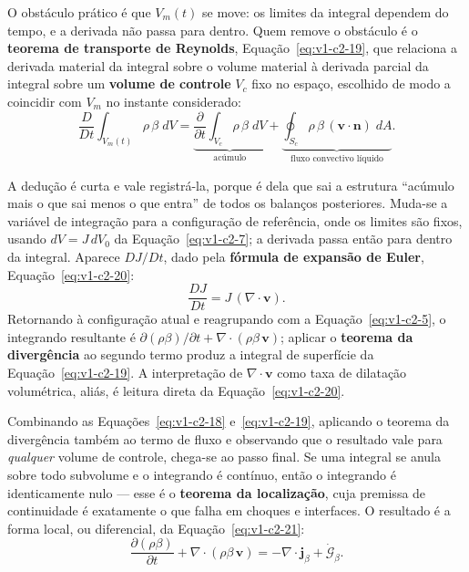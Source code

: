 \documentclass[12pt,a4paper]{article}
\numberwithin{equation}{section}
\numberwithin{table}{section}
\numberwithin{figure}{section}
\begin{document}
O obstáculo prático é que $V_m(t)$ se move: os limites da integral dependem do
tempo, e a derivada não passa para dentro. Quem remove o obstáculo é o
\textbf{teorema de transporte de Reynolds}, Equação~\eqref{eq:v1-c2-19}, que
relaciona a derivada material da integral sobre o volume material à derivada
parcial da integral sobre um \textbf{volume de controle} $V_c$ fixo no espaço,
escolhido de modo a coincidir com $V_m$ no instante considerado:
\begin{equation}\label{eq:v1-c2-19}
\frac{D}{Dt}\int_{V_m(t)} \rho\,\beta \; dV =
\underbrace{\frac{\partial}{\partial t}\int_{V_c} \rho\,\beta \; dV}_{\text{acúmulo}} +
\underbrace{\oint_{S_c} \rho\,\beta \,(\mathbf{v}\cdot\mathbf{n}) \; dA}_{\text{fluxo convectivo líquido}} .
\end{equation}

A dedução é curta e vale registrá-la, porque é dela que sai a estrutura
``acúmulo mais o que sai menos o que entra'' de todos os balanços posteriores.
Muda-se a variável de integração para a configuração de referência, onde os
limites são fixos, usando $dV = J\,dV_0$ da Equação~\eqref{eq:v1-c2-7}; a
derivada passa então para dentro da integral. Aparece $DJ/Dt$, dado pela
\textbf{fórmula de expansão de Euler}, Equação~\eqref{eq:v1-c2-20}:
\begin{equation}\label{eq:v1-c2-20}
\frac{DJ}{Dt} = J \, (\nabla\cdot\mathbf{v}).
\end{equation}
Retornando à configuração atual e reagrupando com a
Equação~\eqref{eq:v1-c2-5}, o integrando resultante é
$\partial(\rho\beta)/\partial t + \nabla\cdot(\rho\beta\,\mathbf{v})$; aplicar
o \textbf{teorema da divergência} ao segundo termo produz a integral de
superfície da Equação~\eqref{eq:v1-c2-19}. A interpretação de
$\nabla\cdot\mathbf{v}$ como taxa de dilatação volumétrica, aliás, é leitura
direta da Equação~\eqref{eq:v1-c2-20}.

Combinando as Equações~\eqref{eq:v1-c2-18} e~\eqref{eq:v1-c2-19}, aplicando o
teorema da divergência também ao termo de fluxo e observando que o resultado
vale para \emph{qualquer} volume de controle, chega-se ao passo final. Se uma
integral se anula sobre todo subvolume e o integrando é contínuo, então o
integrando é identicamente nulo --- esse é o \textbf{teorema da localização},
cuja premissa de continuidade é exatamente o que falha em choques e interfaces.
O resultado é a forma local, ou diferencial, da Equação~\eqref{eq:v1-c2-21}:
\begin{equation}\label{eq:v1-c2-21}
\frac{\partial (\rho\beta)}{\partial t} + \nabla\cdot(\rho\beta\,\mathbf{v})
= -\nabla\cdot\mathbf{j}_\beta + \dot{\mathcal{G}}_\beta .
\end{equation}
\end{document}
